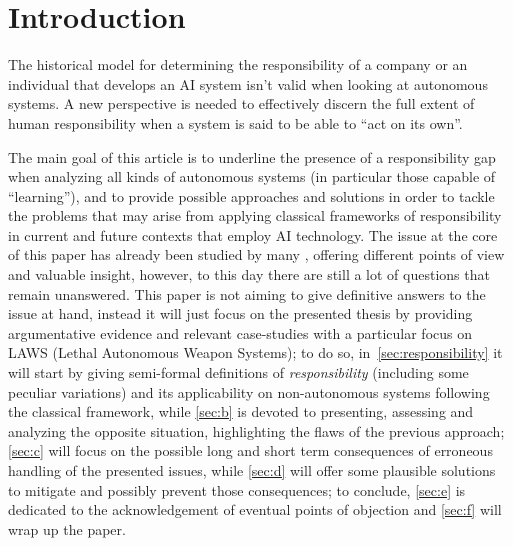 \section{Introduction}\label{sec:introduction}

The historical model for determining the responsibility of a company or an individual that develops an AI system isn't valid when looking at autonomous systems.
A new perspective is needed to effectively discern the full extent of human responsibility when a system is said to be able to ``act on its own''.

The main goal of this article is to underline the presence of a responsibility gap \parencite{MATTRG} when analyzing all kinds of autonomous systems (in particular those capable of ``learning''), and to provide possible approaches and solutions in order to tackle the problems that may arise from applying classical frameworks of responsibility in current and future contexts that employ AI technology.
The issue at the core of this paper has already been studied by many \parencite{MATTRG, SANFRG, COEAIR, NOVAIA}, offering different points of view and valuable insight, however, to this day there are still a lot of questions that remain unanswered.
This paper is not aiming to give definitive answers to the issue at hand, instead it will just focus on the presented thesis by providing argumentative evidence and relevant case-studies with a particular focus on LAWS (Lethal Autonomous Weapon Systems); to do so, in~\autoref{sec:responsibility} it will start by giving semi-formal definitions of \textit{responsibility} (including some peculiar variations) and its applicability on non-autonomous systems following the classical framework, while \autoref{sec:b} is devoted to presenting, assessing and analyzing the opposite situation, highlighting the flaws of the previous approach; \autoref{sec:c} will focus on the possible long and short term consequences of erroneous handling of the presented issues, while \autoref{sec:d} will offer some plausible solutions to mitigate and possibly prevent those consequences; to conclude, \autoref{sec:e} is dedicated to the acknowledgement of eventual points of objection and \autoref{sec:f} will wrap up the paper.
